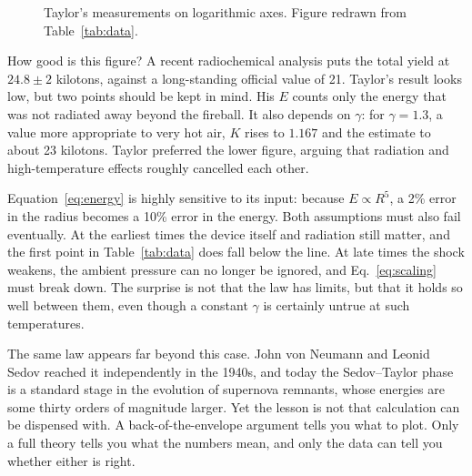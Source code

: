 \documentclass[11pt,a4paper]{article}
\begin{document}
\begin{figure}[t]
\centering
{}
\caption{Taylor's measurements on logarithmic axes. Figure redrawn from Table~\ref{tab:data}.}
\label{fig:loglog}
\end{figure}

\pn How good is this figure? A recent radiochemical analysis puts the total yield at $24.8\pm2$ kilotons, against a long-standing official value of 21. Taylor's result looks low, but two points should be kept in mind. His $E$ counts only the energy that was not radiated away beyond the fireball. It also depends on $\gamma$: for $\gamma=1.3$, a value more appropriate to very hot air, $K$ rises to $1.167$ and the estimate to about 23 kilotons. Taylor preferred the lower figure, arguing that radiation and high-temperature effects roughly cancelled each other.


\pn Equation~\eqref{eq:energy} is highly sensitive to its input: because $E\propto R^5$, a 2\% error in the radius becomes a 10\% error in the energy. Both assumptions must also fail eventually. At the earliest times the device itself and radiation still matter, and the first point in Table~\ref{tab:data} does fall below the line. At late times the shock weakens, the ambient pressure can no longer be ignored, and Eq.~\eqref{eq:scaling} must break down. The surprise is not that the law has limits, but that it holds so well between them, even though a constant $\gamma$ is certainly untrue at such temperatures.

\pn The same law appears far beyond this case. John von Neumann and Leonid Sedov reached it independently in the 1940s, and today the Sedov--Taylor phase is a standard stage in the evolution of supernova remnants, whose energies are some thirty orders of magnitude larger. Yet the lesson is not that calculation can be dispensed with. A back-of-the-envelope argument tells you what to plot. Only a full theory tells you what the numbers mean, and only the data can tell you whether either is right.
\end{document}
